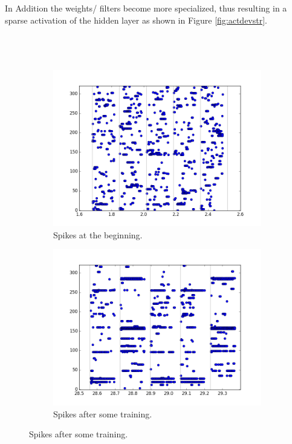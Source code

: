 In Addition the weights/ filters become more specialized, thus resulting in a sparse activation of the hidden layer as shown in Figure \ref{fig:actdevstr}.  
\\\\\\\\
\begin{figure}[h!]
	\centering
	\begin{subfigure}[t]{.32\textwidth}
  		\centering
  		\includegraphics[width=.9\linewidth]{imgs/reconst/00030_h.png}
  		\caption{Spikes at the beginning.}
  		\label{fig:sub1}
	\end{subfigure}%
	\begin{subfigure}[t]{.32\textwidth}
  		\centering
  		\includegraphics[width=.9\linewidth]{imgs/reconst/00975_h.png}
  		\caption{Spikes after some training.}
  		\label{fig:sub2}
	\end{subfigure}

\end{figure}

